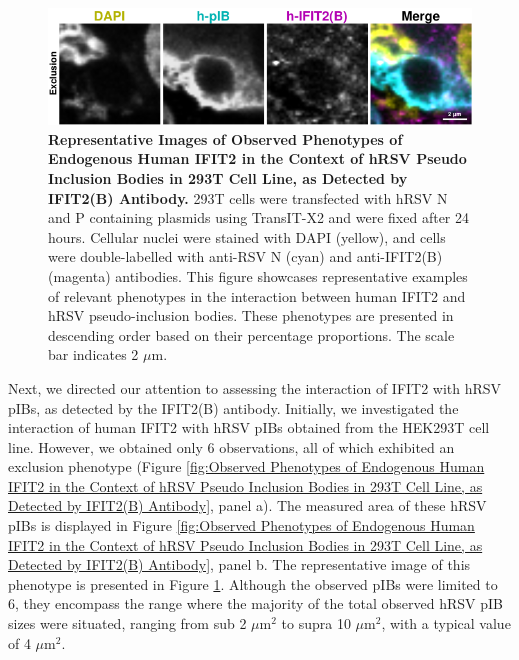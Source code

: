 \begin{figure}
    \centering
    \includegraphics[width=1\linewidth]{09. Chapter 4/Figs/01. pIB/03. IFIT2/03. IFIT2B/03. i2b-293t-hnhp.pdf} 
    \caption[Representative Images of Observed Phenotypes of Endogenous Human IFIT2 in the Context of hRSV Pseudo Inclusion Bodies in 293T Cell Line, as Detected by IFIT2(B) Antibody.]{\textbf{Representative Images of Observed Phenotypes of Endogenous Human IFIT2 in the Context of hRSV Pseudo Inclusion Bodies in 293T Cell Line, as Detected by IFIT2(B) Antibody.} 293T cells were transfected with hRSV N and P containing plasmids using TransIT-X2 and were fixed after 24 hours. Cellular nuclei were stained with DAPI (yellow), and cells were double-labelled with anti-RSV N (cyan) and anti-IFIT2(B) (magenta) antibodies. This figure showcases representative examples of relevant phenotypes in the interaction between human IFIT2 and hRSV pseudo-inclusion bodies. These phenotypes are presented in descending order based on their percentage proportions. The scale bar indicates 2 \(\mu \mbox{m}\).}
    \label{fig:Representative Images of Observed Phenotypes of Endogenous Human IFIT2 in the Context of hRSV Pseudo Inclusion Bodies in 293T Cell Line, as Detected by IFIT2(B) Antibody}
\end{figure}

Next, we directed our attention to assessing the interaction of IFIT2 with hRSV pIBs, as detected by the IFIT2(B) antibody. Initially, we investigated the interaction of human IFIT2 with hRSV pIBs obtained from the HEK293T cell line. However, we obtained only 6 observations, all of which exhibited an exclusion phenotype (Figure \ref{fig:Observed Phenotypes of Endogenous Human IFIT2 in the Context of hRSV Pseudo Inclusion Bodies in 293T Cell Line, as Detected by IFIT2(B) Antibody}, panel a). The measured area of these hRSV pIBs is displayed in Figure \ref{fig:Observed Phenotypes of Endogenous Human IFIT2 in the Context of hRSV Pseudo Inclusion Bodies in 293T Cell Line, as Detected by IFIT2(B) Antibody}, panel b. The representative image of this phenotype is presented in Figure \ref{fig:Representative Images of Observed Phenotypes of Endogenous Human IFIT2 in the Context of hRSV Pseudo Inclusion Bodies in 293T Cell Line, as Detected by IFIT2(B) Antibody}. Although the observed pIBs were limited to 6, they encompass the range where the majority of the total observed hRSV pIB sizes were situated, ranging from sub 2 \(\mu \mbox{m}^2\) to supra 10 \(\mu \mbox{m}^2\), with a typical value of 4 \(\mu \mbox{m}^2\).

